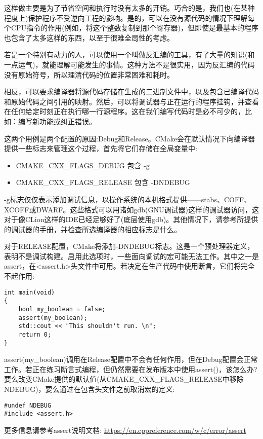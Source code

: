 这样做主要是为了节省空间和执行时没有太多的开销。巧合的是，我们也(在某种程度上)保护程序不受逆向工程的影响。是的，可以在没有源代码的情况下理解每个CPU指令的作用(例如，将这个整数复制到那个寄存器)，但即使是最基本的程序也包含了太多这样的东西，以至于很难全局性的考虑。

若是一个特别有动力的人，可以使用一个叫做反汇编的工具，有了大量的知识(和一点运气)，就能理解可能发生的事情。这种方法不是很实用，因为反汇编的代码没有原始符号，所以理清代码的位置非常困难和耗时。

相反，可以要求编译器将源代码存储在生成的二进制文件中，以及包含已编译代码和原始代码之间引用的映射。然后，可以将调试器与正在运行的程序挂钩，并查看在任何给定时刻正在执行哪一行源程序。这在我们编写代码时是必不可少的，比如：编写新功能或纠正错误。

这两个用例是两个配置的原因:Debug和Release。CMake会在默认情况下向编译器提供一些标志来管理这个过程，首先将它们存储在全局变量中:

\begin{itemize}
\item 
CMAKE\_CXX\_FLAGS\_DEBUG 包含 -g

\item 
CMAKE\_CXX\_FLAGS\_RELEASE 包含 -DNDEBUG
\end{itemize}

-g标志仅仅表示添加调试信息，以操作系统的本机格式提供——stabs、COFF、XCOFF或DWARF。这些格式可以用诸如gdb(GNU调试器)这样的调试器访问，这对于像CLion这样的IDE已经足够好了(底层使用gdb)。其他情况下，请参考所提供的调试器的手册，并检查所选编译器的相应标志是什么。

对于RELEASE配置，CMake将添加-DNDEBUG标志。这是一个预处理器定义，表明不是调试构建。启用此选项时，一些面向调试的宏可能无法工作。其中之一是assert，在<assert.h>头文件中可用。若决定在生产代码中使用断言，它们将完全不起作用:

\begin{lstlisting}[style=styleCXX]
int main(void)
{
	bool my_boolean = false;
	assert(my_boolean);
	std::cout << "This shouldn't run. \n";
	return 0;
}
\end{lstlisting}

assert(my\_boolean)调用在Release配置中不会有任何作用，但在Debug配置会正常工作。若正在练习断言式编程，但仍然需要在发布版本中使用assert()，该怎么办?要么改变CMake提供的默认值(从CMAKE\_CXX\_FLAGS\_RELEASE中移除NDEBUG)，要么通过在包含头文件之前取消宏的定义:

\begin{lstlisting}[style=styleCXX]
#undef NDEBUG
#include <assert.h>
\end{lstlisting}

更多信息请参考assert说明文档: \url{https://en.cppreference.com/w/c/error/assert}
